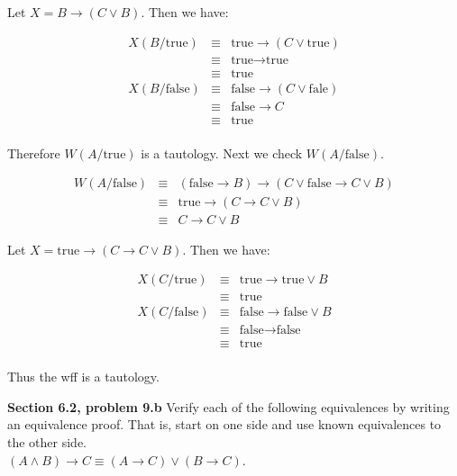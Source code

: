 \documentclass[12pt]{article}
\begin{document}
Let $ X = B \rightarrow (C \lor B).$ Then we have:

\begin{center}
\begin{eqnarray*}
X(B/\text{true}) & \equiv & \text{true} \rightarrow (C \lor \text{true}) \\
& \equiv & \text{true} \rightarrow \text{true} \\
& \equiv & \text{true} \\
X(B/\text{false}) & \equiv & \text{false} \rightarrow (C \lor \text{fale}) \\
& \equiv & \text{false} \rightarrow C \\
& \equiv & \text{true} \\
\end{eqnarray*}
\end{center}

Therefore $W(A/\text{true})$ is a tautology.  Next we check $W(A/\text{false})$.

\begin{center}
\begin{eqnarray*}
W(A/\text{false}) & \equiv & (\text{false}\rightarrow B) 
\rightarrow (C \lor \text{false} \rightarrow C \lor B) \\ 
& \equiv & \text{true} \rightarrow (C \rightarrow C \lor B) \\
& \equiv & C \rightarrow C \lor B 
\end{eqnarray*}
\end{center}

Let $ X = \text{true} \rightarrow (C \rightarrow C \lor B).$ Then we have:

\begin{center}
\begin{eqnarray*}
X(C/\text{true}) & \equiv & \text{true} \rightarrow \text{true} \lor B \\ 
& \equiv & \text{true} \\
X(C/\text{false})
& \equiv & \text{false} \rightarrow \text{false} \lor B \\ 
& \equiv & \text{false} \rightarrow \text{false} \\
& \equiv & \text{true} \\
\end{eqnarray*}
\end{center}

Thus the wff is a tautology.

\textbf{Section 6.2, problem 9.b} Verify each of the following equivalences by writing an equivalence proof.
That is, start on one side and use known equivalences to the other side. \\
$(A\land B) \rightarrow C \equiv (A \rightarrow C) \lor (B \rightarrow C)$.
\end{document}
